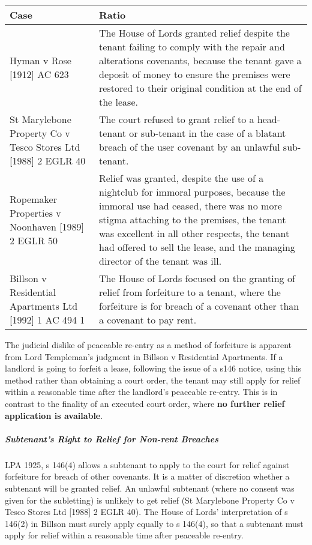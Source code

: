 \documentclass[
]{article}
\begin{document}
\begin{longtable}[]{@{}ll@{}}
\toprule()
Case & Ratio \\
\midrule()
\endhead
Hyman v Rose {[}1912{]} AC 623 & The House of Lords granted relief
despite the tenant failing to comply with the repair and alterations
covenants, because the tenant gave a deposit of money to ensure the
premises were restored to their original condition at the end of the
lease. \\
St Marylebone Property Co v Tesco Stores Ltd {[}1988{]} 2 EGLR 40 & The
court refused to grant relief to a head-tenant or sub-tenant in the case
of a blatant breach of the user covenant by an unlawful sub-tenant. \\
Ropemaker Properties v Noonhaven {[}1989{]} 2 EGLR 50 & Relief was
granted, despite the use of a nightclub for immoral purposes, because
the immoral use had ceased, there was no more stigma attaching to the
premises, the tenant was excellent in all other respects, the tenant had
offered to sell the lease, and the managing director of the tenant was
ill. \\
Billson v Residential Apartments Ltd {[}1992{]} 1 AC 494 1 & The House
of Lords focused on the granting of relief from forfeiture to a tenant,
where the forfeiture is for breach of a covenant other than a covenant
to pay rent. \\
\bottomrule()
\end{longtable}

The judicial dislike of peaceable re-entry as a method of forfeiture is
apparent from Lord Templeman's judgment in Billson v Residential
Apartments. If a landlord is going to forfeit a lease, following the
issue of a s146 notice, using this method rather than obtaining a court
order, the tenant may still apply for relief within a reasonable time
after the landlord's peaceable re-entry. This is in contrast to the
finality of an executed court order, where \textbf{no further relief
application is available}.

\hypertarget{subtenants-right-to-relief-for-non-rent-breaches}{%
\subparagraph{Subtenant's Right to Relief for Non-rent
Breaches}\label{subtenants-right-to-relief-for-non-rent-breaches}}

LPA 1925, s 146(4) allows a subtenant to apply to the court for relief
against forfeiture for breach of other covenants. It is a matter of
discretion whether a subtenant will be granted relief. An unlawful
subtenant (where no consent was given for the subletting) is unlikely to
get relief (St Marylebone Property Co v Tesco Stores Ltd {[}1988{]} 2
EGLR 40). The House of Lords' interpretation of s 146(2) in Billson must
surely apply equally to s 146(4), so that a subtenant must apply for
relief within a reasonable time after peaceable re-entry.
\end{document}
